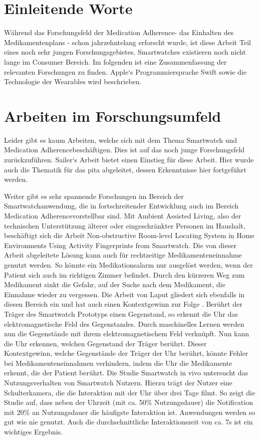 \section{Einleitende Worte}
Während das Forschungsfeld der \glqq Medication Adherence\grqq - das Einhalten des Medikamentenplans - schon jahrzehntelang erforscht wurde, ist diese Arbeit Teil eines noch sehr jungen Forschungsgebietes. Smartwatches existieren noch nicht lange im Consumer Bereich. Im folgenden ist eine Zusammenfassung der relevanten Forschungen zu finden. Apple`s Programmiersprache Swift sowie die Technologie der Wearables wird beschrieben.
\section{Arbeiten im Forschungsumfeld}
Leider gibt es kaum Arbeiten, welche sich mit dem Thema Smartwatch und \glqq Medication Adherence\grqq   beschäftigen. Dies ist auf das noch junge Forschungsfeld zurückzuführen. Sailer`s Arbeit \cite{Fabian-Sailer:2015aa} bietet einen Einstieg für diese Arbeit. Hier wurde auch die Thematik für das \gls{pita} abgeleitet, dessen Erkenntnisse hier fortgeführt werden. 

Weiter gibt es sehr spannende Forschungen im Bereich der Smartwatchanwendung, die in fortschreitender Entwicklung auch im Bereich \glqq Medication Adherence\grqq vorstellbar sind. Mit Ambient Assisted Living, also der technischen Unterstützung älterer oder eingeschränkter Personen im Haushalt, beschäftigt sich die Arbeit \glqq Non-obstructive Room-level Locating System in Home Environments Using Activity Fingerprints from Smartwatch\grqq\cite{Lee:2015:NRL:2750858.2804272}. Die von dieser Arbeit abgeleitete Lösung kann auch für rechtzeitige Medikamenteneinnahme genutzt werden. So könnte ein Medikationsalarm nur ausgelöst werden, wenn der Patient sich auch im richtigen Zimmer befindet. Durch den kürzeren Weg zum Medikament sinkt die Gefahr, auf der Suche nach dem Medikament, die Einnahme wieder zu vergessen. Die Arbeit von Laput gliedert sich ebenfalls in diesen Bereich ein und hat auch einen Kontextgewinn zur Folge \cite{Laput:2015:ETR:2807442.2807481}. Berührt der Träger des  Smartwatch Prototyps einen Gegenstand, so erkennt die Uhr das elektromagnetische Feld des Gegenstandes. Durch maschinelles Lernen werden nun die Gegenstände mit ihrem elektromagnetischem Feld verknüpft. Nun kann die Uhr erkennen, welchen Gegenstand der Träger berührt. Dieser Kontextgewinn, welche Gegenstände der Träger der Uhr berührt, könnte Fehler bei Medikamenteneinnahmen verhindern, indem die Uhr die Medikamente erkennt, die der Patient berührt.
Die Studie \glqq Smartwatch in vivo\grqq \cite{Pizza:2016} untersucht das Nutzungsverhalten von Smartwatch Nutzern. Hierzu trägt der Nutzer eine Schulterkamera, die die Interaktion mit der Uhr über drei Tage filmt. So zeigt die Studie auf, dass neben der Uhrzeit (mit ca. 50\% Nutzungsdauer) die Notification mit 20\% an Nutzungsdauer die häufigste Interaktion ist. Anwendungen werden so gut wie nie genutzt. Auch die durchschnittliche Interaktionszeit von ca. 7s ist ein wichtiges Ergebnis.

